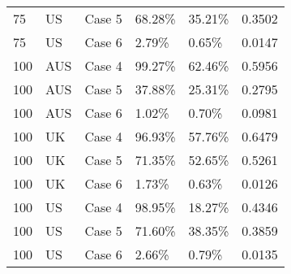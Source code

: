 \begin{table}[ht]
\begin{tabular}{llllll}
  75 & US & Case 5 & 68.28\% & 35.21\% & 0.3502 \\ 
  75 & US & Case 6 & 2.79\% & 0.65\% & 0.0147 \\ 
  100 & AUS & Case 4 & 99.27\% & 62.46\% & 0.5956 \\ 
  100 & AUS & Case 5 & 37.88\% & 25.31\% & 0.2795 \\ 
  100 & AUS & Case 6 & 1.02\% & 0.70\% & 0.0981 \\ 
  100 & UK & Case 4 & 96.93\% & 57.76\% & 0.6479 \\ 
  100 & UK & Case 5 & 71.35\% & 52.65\% & 0.5261 \\ 
  100 & UK & Case 6 & 1.73\% & 0.63\% & 0.0126 \\ 
  100 & US & Case 4 & 98.95\% & 18.27\% & 0.4346 \\ 
  100 & US & Case 5 & 71.60\% & 38.35\% & 0.3859 \\ 
  100 & US & Case 6 & 2.66\% & 0.79\% & 0.0135 \\ 
   \hline
\end{tabular}
\end{table}
